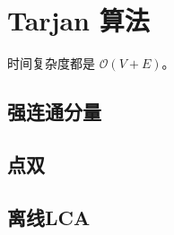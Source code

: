 \section{Tarjan 算法}

时间复杂度都是 $\mathcal{O}(V+E)$。

\subsection{强连通分量}



\subsection{点双}



\subsection{离线LCA}


